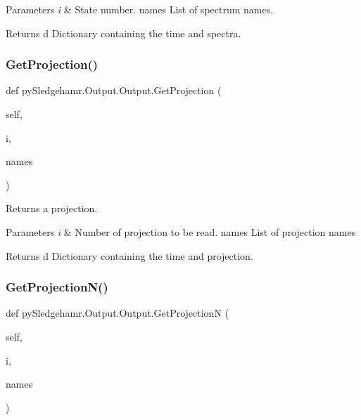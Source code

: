 \begin{DoxyParams}{Parameters}
{\em i} & State number.  names List of spectrum names. \\
\hline
\end{DoxyParams}
\begin{DoxyReturn}{Returns}
d Dictionary containing the time and spectra. 
\end{DoxyReturn}
\mbox{\label{classpySledgehamr_1_1Output_1_1Output_a9061b33b7378f540d7ecef65a94f2c46}} 
\subsubsection{\texorpdfstring{Get\+Projection()}{GetProjection()}}
{\footnotesize\ttfamily def py\+Sledgehamr.\+Output.\+Output.\+Get\+Projection (\begin{DoxyParamCaption}\item[{}]{self,  }\item[{}]{i,  }\item[{}]{names }\end{DoxyParamCaption})}



Returns a projection. 


\begin{DoxyParams}{Parameters}
{\em i} & Number of projection to be read.  names List of projection names \\
\hline
\end{DoxyParams}
\begin{DoxyReturn}{Returns}
d Dictionary containing the time and projection. 
\end{DoxyReturn}
\mbox{\label{classpySledgehamr_1_1Output_1_1Output_a55e468a29e5b6fe519ff3689d560fd7e}} 
\subsubsection{\texorpdfstring{Get\+Projection\+N()}{GetProjectionN()}}
{\footnotesize\ttfamily def py\+Sledgehamr.\+Output.\+Output.\+Get\+ProjectionN (\begin{DoxyParamCaption}\item[{}]{self,  }\item[{}]{i,  }\item[{}]{names }\end{DoxyParamCaption})}



